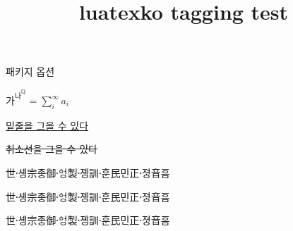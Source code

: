 \documentclass{article}
\title{luatexko tagging test}
\begin{document}
패키지 옵션

$가^{나^다}=\sum_i^\infty a_i$




\uline{밑줄을 그을 수 있다}

\sout{취소선을 그을 수 있다}






\hellipsis

\begin{vertical}{20em}
\verticalhangulfont
世솅〮宗조ᇰ御ᅌᅥᆼ〮製졩〮訓훈〮民민正져ᇰ〮音ᅙᅳᆷ
\end{vertical}

\begin{verticaltypesetting}
\verticalhangulfont
世솅〮宗조ᇰ御ᅌᅥᆼ〮製졩〮訓훈〮民민正져ᇰ〮音ᅙᅳᆷ
\begin{horizontal}{20em}
\normalfont
世솅〮宗조ᇰ御ᅌᅥᆼ〮製졩〮訓훈〮民민正져ᇰ〮音ᅙᅳᆷ
\end{horizontal}
\end{verticaltypesetting}
\end{document}
